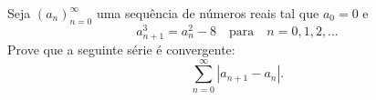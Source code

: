 Seja \((a_n)_{n=0}^{\infty}\) uma sequência de números reais tal que \(a_0=0\) e
\[a_{n+1}^3=a_n^2-8\quad \text{para} \quad n=0,1,2,\ldots\] Prove que a seguinte série é convergente:
\[\sum_{n=0}^{\infty}{|a_{n+1}-a_n|}.\]
